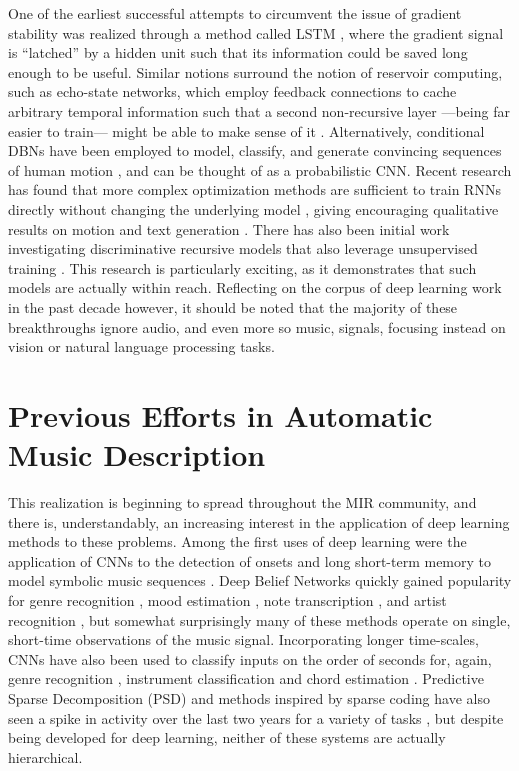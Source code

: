 One of the earliest successful attempts to circumvent the issue of gradient stability was realized through a method called LSTM \cite{Schmidhuber1997}, where the gradient signal is ``latched'' by a hidden unit such that its information could be saved long enough to be useful.
Similar notions surround the notion of reservoir computing, such as echo-state networks, which employ feedback connections to cache arbitrary temporal information such that a second non-recursive layer ---being far easier to train--- might be able to make sense of it \cite{Jaeger2002}.
Alternatively, conditional DBNs have been employed to model, classify, and generate convincing sequences of human motion \cite{JMLR2011}, and can be thought of as a probabilistic CNN.
Recent research has found that more complex optimization methods are sufficient to train RNNs directly without changing the underlying model \cite{Martens2010}, giving encouraging qualitative results on motion \cite{Sutskever2008} and text generation \cite{Sutskever2011}.
There has also been initial work investigating discriminative recursive models that also leverage unsupervised training \cite{Rolfe2013}.
This research is particularly exciting, as it demonstrates that such models are actually within reach.
Reflecting on the corpus of deep learning work in the past decade however, it should be noted that the majority of these breakthroughs ignore audio, and even more so music, signals, focusing instead on vision or natural language processing tasks.


\section{Previous Efforts in Automatic Music Description}

This realization is beginning to spread throughout the MIR community, and there is, understandably, an increasing interest in the application of deep learning methods to these problems.
Among the first uses of deep learning were the application of CNNs to the detection of onsets \cite{Lacoste2007} and long short-term memory to model symbolic music sequences \cite{Eck2008}.
Deep Belief Networks quickly gained popularity for genre recognition \cite{Hamel2009}, mood estimation \cite{Schmidt2011}, note transcription \cite{Nam2011}, and artist recognition \cite{Dieleman2011}, but somewhat surprisingly many of these methods operate on single, short-time observations of the music signal.
Incorporating longer time-scales, CNNs have also been used to classify inputs on the order of seconds for, again, genre recognition \cite{Li2010}, instrument classification \cite{Humphrey2010} and chord estimation \cite{Humphrey2011, Humphrey2012b}.
Predictive Sparse Decomposition (PSD) and methods inspired by sparse coding have also seen a spike in activity over the last two years for a variety of tasks \cite{Henaff2011, Nam2012}, but despite being developed for deep learning, neither of these systems are actually hierarchical.

